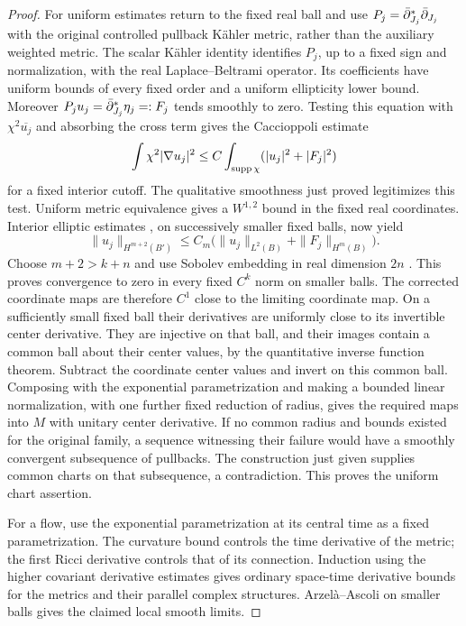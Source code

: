 \begin{proof}
For uniform estimates return to the fixed real ball and use
$P_j=\bar\partial_{J_j}^*\bar\partial_{J_j}$ with the original controlled
pullback K\"ahler metric, rather than the auxiliary weighted metric.
The scalar K\"ahler identity identifies $P_j$, up to a fixed sign
and normalization, with the real Laplace--Beltrami operator.
Its coefficients have uniform bounds of every fixed order and a
uniform ellipticity lower bound.  Moreover
$P_ju_j=\bar\partial_{J_j}^*\eta_j=:F_j$ tends smoothly to zero.
Testing this equation with $\chi^2\overline{u_j}$ and absorbing
the cross term gives the Caccioppoli estimate
\[
 \int\chi^2|\nabla u_j|^2
 \le C\int_{\operatorname{supp}\chi}(|u_j|^2+|F_j|^2)
\]
for a fixed interior cutoff.  The qualitative smoothness just
proved legitimizes this test.  Uniform metric equivalence gives a
$W^{1,2}$ bound in the fixed real coordinates.  Interior elliptic
estimates \cite[Theorems~8.8 and~8.10]{GilbargTrudinger}, on
successively smaller fixed balls, now yield
\[
 \|u_j\|_{H^{m+2}(B')}
 \le C_m\bigl(\|u_j\|_{L^2(B)}+\|F_j\|_{H^m(B)}\bigr).
\]
Choose $m+2>k+n$ and use Sobolev embedding in real dimension $2n$
\cite[Section~5.6.3, Theorem~6]{EvansPDE}.  This proves convergence
to zero in every fixed $C^k$ norm on smaller balls.  The corrected
coordinate maps are therefore $C^1$ close to the limiting coordinate
map.  On a sufficiently small fixed ball their derivatives are
uniformly close to its invertible center derivative.  They are
injective on that ball, and their images contain a common ball about
their center values, by the quantitative inverse function theorem.
Subtract the coordinate center values and invert on this common ball.
Composing with the exponential parametrization and making a bounded
linear normalization, with one further fixed reduction of radius,
gives the required maps into $M$ with unitary center derivative.
If no common radius and bounds existed for the original family, a
sequence witnessing their failure would have a smoothly convergent
subsequence of pullbacks.  The construction just given supplies common
charts on that subsequence, a contradiction.  This proves the uniform
chart assertion.

For a flow, use the exponential parametrization at its central
time as a fixed parametrization.  The curvature bound controls
the time derivative of the metric; the first Ricci derivative
controls that of its connection.  Induction using the higher
covariant derivative estimates gives ordinary space-time
derivative bounds for the metrics and their parallel complex
structures.  Arzel\`a--Ascoli on smaller balls gives the claimed
local smooth limits.
\end{proof}

